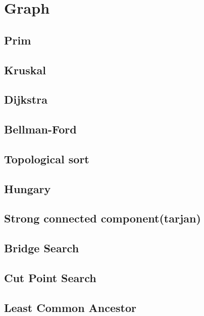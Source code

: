 \newpage
\section{Graph}

\subsection{Prim}


\subsection{Kruskal}


\subsection{Dijkstra}


\subsection{Bellman-Ford}


\subsection{Topological sort}


\subsection{Hungary}


\subsection{Strong connected component(tarjan)}


\subsection{Bridge Search}


\subsection{Cut Point Search}


\subsection{Least Common Ancestor}

